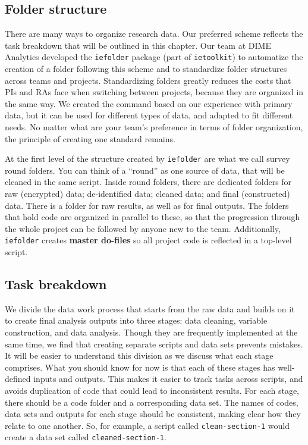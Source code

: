 \subsection{Folder structure}

There are many ways to organize research data. 
Our preferred scheme reflects the task breakdown that will be outlined in this chapter.
Our team at DIME Analytics developed the \texttt{iefolder}
package (part of \texttt{ietoolkit})
to automatize the creation of a folder following this scheme and
to standardize folder structures across teams and projects.
Standardizing folders greatly reduces the costs that PIs and RAs face when switching between projects, 
because they are organized in the same way.
We created the command based on our experience with primary data,
but it can be used for different types of data,
and adapted to fit different needs.
No matter what are your team's preference in terms of folder organization, 
the principle of creating one standard remains.

At the first level of the structure created by \texttt{iefolder} are what we call survey round folders.
You can think of a ``round'' as one source of data, 
that will be cleaned in the same script. 
Inside round folders, there are dedicated folders for 
raw (encrypted) data; de-identified data; cleaned data; and final (constructed) data. 
There is a folder for raw results, as well as for final outputs. 
The folders that hold code are organized in parallel to these, 
so that the progression through the whole project can be followed by anyone new to the team.  
Additionally, \texttt{iefolder} creates \textbf{master do-files} 
so all project code is reflected in a top-level script.

\subsection{Task breakdown}

We divide the data work process that starts from the raw data 
and builds on it to create final analysis outputs into three stages: 
data cleaning, variable construction, and data analysis. 
Though they are frequently implemented at the same time, 
we find that creating separate scripts and data sets prevents mistakes. 
It will be easier to understand this division as we discuss what each stage comprises. 
What you should know for now is that each of these stages has well-defined inputs and outputs. 
This makes it easier to track tasks across scripts, 
and avoids duplication of code that could lead to inconsistent results. 
For each stage, there should be a code folder and a corresponding data set. 
The names of codes, data sets and outputs for each stage should be consistent,
making clear how they relate to one another. 
So, for example, a script called \texttt{clean-section-1} would create
a data set called \texttt{cleaned-section-1}.

